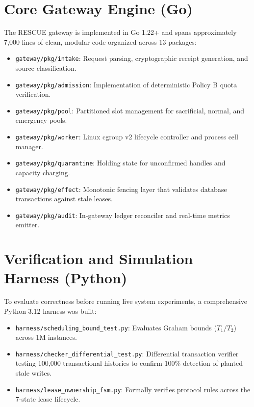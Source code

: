 \documentclass[12pt,a4paper]{report}
\begin{document}
\section{Core Gateway Engine (Go)}
The RESCUE gateway is implemented in Go 1.22+ and spans approximately 7,000 lines of clean, modular code organized across 13 packages:
\begin{itemize}
    \item \texttt{gateway/pkg/intake}: Request parsing, cryptographic receipt generation, and source classification.
    \item \texttt{gateway/pkg/admission}: Implementation of deterministic Policy B quota verification.
    \item \texttt{gateway/pkg/pool}: Partitioned slot management for sacrificial, normal, and emergency pools.
    \item \texttt{gateway/pkg/worker}: Linux cgroup v2 lifecycle controller and process cell manager.
    \item \texttt{gateway/pkg/quarantine}: Holding state for unconfirmed handles and capacity charging.
    \item \texttt{gateway/pkg/effect}: Monotonic fencing layer that validates database transactions against stale leases.
    \item \texttt{gateway/pkg/audit}: In-gateway ledger reconciler and real-time metrics emitter.
\end{itemize}

\section{Verification and Simulation Harness (Python)}
To evaluate correctness before running live system experiments, a comprehensive Python 3.12 harness was built:
\begin{itemize}
    \item \texttt{harness/scheduling\_bound\_test.py}: Evaluates Graham bounds ($T_1/T_2$) across 1M instances.
    \item \texttt{harness/checker\_differential\_test.py}: Differential transaction verifier testing 100,000 transactional histories to confirm 100\% detection of planted stale writes.
    \item \texttt{harness/lease\_ownership\_fsm.py}: Formally verifies protocol rules across the 7-state lease lifecycle.
\end{itemize}

\end{document}
